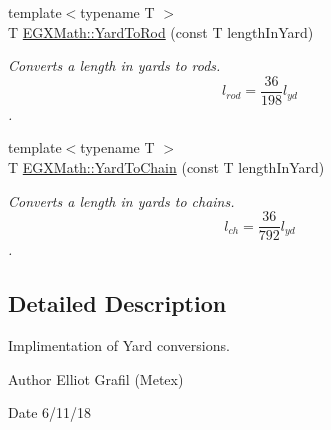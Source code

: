 \begin{DoxyCompactItemize}
{\footnotesize template$<$typename T $>$ }\\T \mbox{\hyperlink{group___e_g_x_math-_conversions-_length_conversions-_imperial-_yard-_surveyors_ga5c59ea68e354d48288451d711d68824f}{E\+G\+X\+Math\+::\+Yard\+To\+Rod}} (const T length\+In\+Yard)
\begin{DoxyCompactList}\small\item\em Converts a length in yards to rods. \[ l_{rod}= \frac{36}{198} l_{yd} \]. \end{DoxyCompactList}\item 
{\footnotesize template$<$typename T $>$ }\\T \mbox{\hyperlink{group___e_g_x_math-_conversions-_length_conversions-_imperial-_yard-_surveyors_ga057832281ac79e2226f88f90810047cf}{E\+G\+X\+Math\+::\+Yard\+To\+Chain}} (const T length\+In\+Yard)
\begin{DoxyCompactList}\small\item\em Converts a length in yards to chains. \[ l_{ch}= \frac{36}{792} l_{yd} \]. \end{DoxyCompactList}\end{DoxyCompactItemize}


\subsection{Detailed Description}
Implimentation of Yard conversions. 

\begin{DoxyAuthor}{Author}
Elliot Grafil (Metex) 
\end{DoxyAuthor}
\begin{DoxyDate}{Date}
6/11/18 
\end{DoxyDate}
